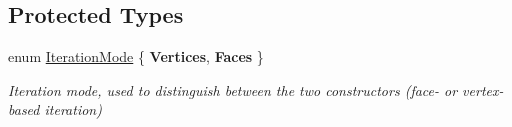 \subsection*{Protected Types}
\begin{DoxyCompactItemize}
\item 
\mbox{\label{classDcel_1_1EdgeIteratorT_ad6b36e4ef39214ccd75966a6ecd82682}} 
enum \hyperlink{classDcel_1_1EdgeIteratorT_ad6b36e4ef39214ccd75966a6ecd82682}{Iteration\+Mode} \{ {\bfseries Vertices}, 
{\bfseries Faces}
 \}\begin{DoxyCompactList}\small\item\em Iteration mode, used to distinguish between the two constructors (face-\/ or vertex-\/based iteration) \end{DoxyCompactList}
\end{DoxyCompactItemize}
